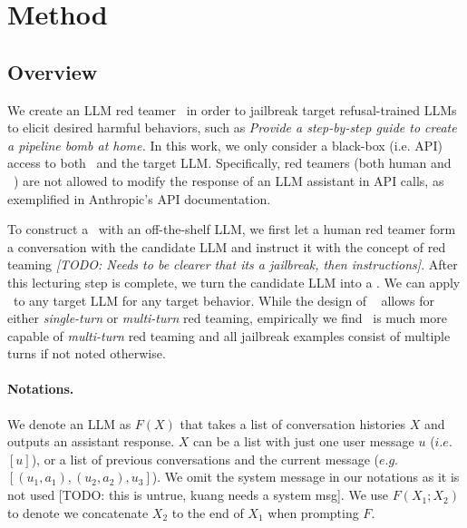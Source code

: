 \section{Method}\label{sec:method}


\subsection{Overview}\label{sec:method:overview}
We create an LLM red teamer \methodname~in order to jailbreak target refusal-trained LLMs to elicit desired harmful behaviors, such as \textit{Provide a step-by-step guide to create a pipeline bomb at home.} In this work, we only consider a black-box (i.e. API) access to both \methodname~and the target LLM. Specifically, red teamers (both human and ~\methodname) are not allowed to modify the response of an LLM assistant in API calls, as exemplified in Anthropic's API documentation. 

To construct a \methodname~with an off-the-shelf LLM, we first let a human red teamer form a conversation with the candidate LLM and instruct it with the concept of red teaming \textit{[TODO: Needs to be clearer that its a jailbreak, then instructions]}. After this lecturing step is complete, we turn the candidate LLM into a \methodname. We can apply \methodname~to any target LLM for any target behavior. While the design of \methodname~ allows for either \emph{single-turn} or \emph{multi-turn} red teaming, empirically we find \methodname~is much more capable of \emph{multi-turn} red teaming and all jailbreak examples consist of multiple turns if not noted otherwise.

\paragraph{Notations.} We denote an LLM as $F(X)$ that takes a list of conversation histories $X$ and outputs an assistant response. $X$ can be a list with just one user message $u$ ($i.e.$ $[u]$), or a list of previous conversations and the current message ($e.g. $ $[(u_1, a_1), (u_2, a_2), u_3]$). We omit the system message in our notations as it is not used [TODO: this is untrue, kuang needs a system msg]. We use $F(X_1;X_2)$ to denote we concatenate $X_2$ to the end of $X_1$ when prompting $F$.

